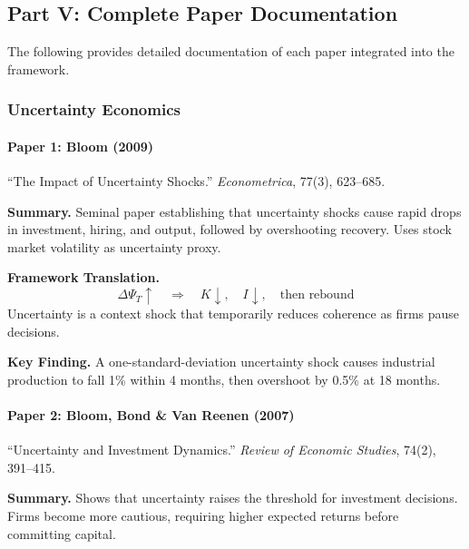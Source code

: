 \subsection{Part V: Complete Paper Documentation}

The following provides detailed documentation of each paper integrated into the framework.

\subsubsection{Uncertainty Economics}

\paragraph{Paper 1: Bloom (2009)}

``The Impact of Uncertainty Shocks.''
\textit{Econometrica}, 77(3), 623--685.

\textbf{Summary.}
Seminal paper establishing that uncertainty shocks cause rapid drops in investment,
hiring, and output, followed by overshooting recovery. Uses stock market volatility
as uncertainty proxy.

\textbf{Framework Translation.}
\begin{equation}
  \Delta \Psi_T \uparrow \quad \Rightarrow \quad K \downarrow, \quad I \downarrow, \quad \text{then rebound}
\end{equation}
Uncertainty is a context shock that temporarily reduces coherence as firms pause decisions.

\textbf{Key Finding.}
A one-standard-deviation uncertainty shock causes industrial production to fall 1\%
within 4 months, then overshoot by 0.5\% at 18 months.

\paragraph{Paper 2: Bloom, Bond \& Van Reenen (2007)}

``Uncertainty and Investment Dynamics.''
\textit{Review of Economic Studies}, 74(2), 391--415.

\textbf{Summary.}
Shows that uncertainty raises the threshold for investment decisions. Firms become
more cautious, requiring higher expected returns before committing capital.

